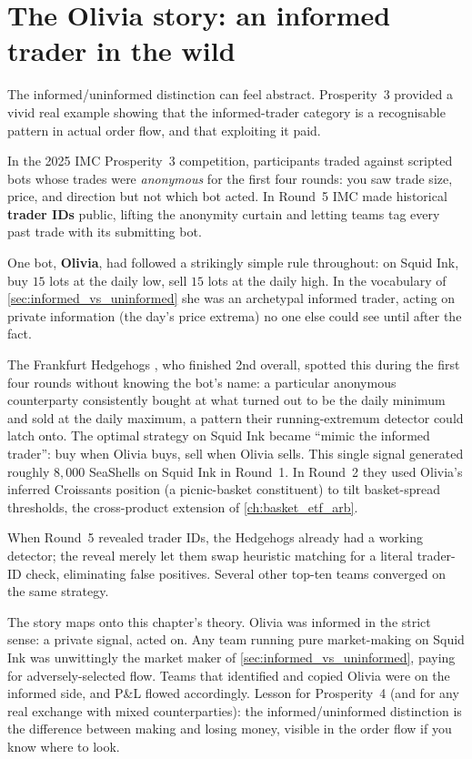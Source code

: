 \section{The Olivia story: an informed trader in the wild}
\label{sec:olivia}

The informed/uninformed distinction can feel abstract. Prosperity~3
provided a vivid real example showing that the informed-trader
category is a recognisable pattern in actual order flow, and that
exploiting it paid.

\begin{prosperitybox}
In the 2025 IMC Prosperity~3 competition, participants traded against
scripted bots whose trades were \emph{anonymous} for the first four
rounds: you saw trade size, price, and direction but not which bot
acted. In Round~5 IMC made historical \textbf{trader IDs} public,
lifting the anonymity curtain and letting teams tag every past trade
with its submitting bot.

One bot, \textbf{Olivia}, had followed a strikingly simple rule
throughout: on Squid Ink, buy $15$ lots at the daily low, sell $15$
lots at the daily high. In the vocabulary of
\cref{sec:informed_vs_uninformed} she was an archetypal informed
trader, acting on private information (the day's price extrema) no
one else could see until after the fact.

The Frankfurt Hedgehogs \citep{frankfurtHedgehogs2025imcP3}, who
finished 2nd overall, spotted this during the first four rounds
without knowing the bot's name: a particular anonymous counterparty
consistently bought at what turned out to be the daily minimum and
sold at the daily maximum, a pattern their running-extremum detector
could latch onto. The optimal strategy on Squid Ink became ``mimic the
informed trader'': buy when Olivia buys, sell when Olivia sells. This
single signal generated roughly $8{,}000$ SeaShells on Squid Ink in
Round~1. In Round~2 they used Olivia's inferred Croissants position
(a picnic-basket constituent) to tilt basket-spread thresholds,
the cross-product extension of \cref{ch:basket_etf_arb}.

When Round~5 revealed trader IDs, the Hedgehogs already had a working
detector; the reveal merely let them swap heuristic matching for a
literal trader-ID check, eliminating false positives. Several other
top-ten teams converged on the same strategy.

The story maps onto this chapter's theory. Olivia was informed in the
strict sense: a private signal, acted on. Any team running pure
market-making on Squid Ink was unwittingly the market maker of
\cref{sec:informed_vs_uninformed}, paying for adversely-selected flow.
Teams that identified and copied Olivia were on the informed side, and
P\&L flowed accordingly. Lesson for Prosperity~4 (and for any real
exchange with mixed counterparties): the informed/uninformed
distinction is the difference between making and losing money,
visible in the order flow if you know where to look.
\end{prosperitybox}


